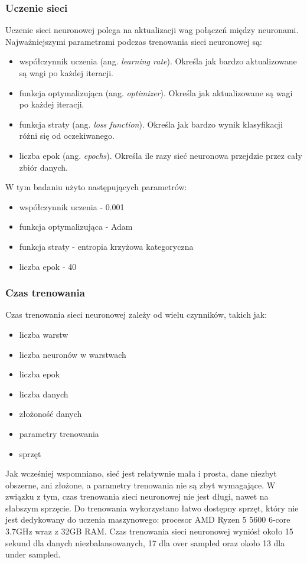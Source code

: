 \subsubsection{Uczenie sieci}\label{subsubsec:uczenie_sieci}
Uczenie sieci neuronowej polega na aktualizacji wag połączeń między neuronami.
Najważniejszymi parametrami podczas trenowania sieci neuronowej są:
\begin{itemize}
    \item współczynnik uczenia (ang. \textit{learning rate}). Określa jak bardzo aktualizowane są wagi po każdej iteracji.
    \item funkcja optymalizująca (ang. \textit{optimizer}). Określa jak aktualizowane są wagi po każdej iteracji.
    \item funkcja straty (ang. \textit{loss function}). Określa jak bardzo wynik klasyfikacji różni się od oczekiwanego.
    \item liczba epok (ang. \textit{epochs}). Określa ile razy sieć neuronowa przejdzie przez cały zbiór danych.
\end{itemize}
W tym badaniu użyto następujących parametrów:
\begin{itemize}
    \item współczynnik uczenia - 0.001
    \item funkcja optymalizująca - Adam
    \item funkcja straty - entropia krzyżowa kategoryczna
    \item liczba epok - 40
\end{itemize}
\subsubsection{Czas trenowania}\label{subsubsec:czas_trenowania_nn}
Czas trenowania sieci neuronowej zależy od wielu czynników, takich jak:
\begin{itemize}
    \item liczba warstw
    \item liczba neuronów w warstwach
    \item liczba epok
    \item liczba danych
    \item złożoność danych
    \item parametry trenowania
    \item sprzęt
\end{itemize}
Jak wcześniej wspomniano, sieć jest relatywnie mała i prosta, dane niezbyt obszerne, ani złożone, a parametry trenowania nie są zbyt wymagające.
W związku z tym, czas trenowania sieci neuronowej nie jest długi, nawet na słabszym sprzęcie.
Do trenowania wykorzystano łatwo dostępny sprzęt, który nie jest dedykowany do uczenia maszynowego: procesor AMD Ryzen 5 5600 6-core 3.7GHz wraz z 32GB RAM.
Czas trenowania sieci neuronowej wyniósł około 15 sekund dla danych niezbalansowanych, 17 dla over sampled oraz około 13 dla under sampled.
